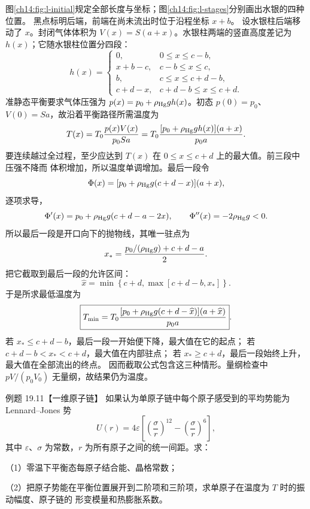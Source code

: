 \begin{xesolution}
图\ref{ch14:fig:l-initial}规定全部长度与坐标；图\ref{ch14:fig:l-stages}分别画出水银的四种位置。
黑点标明后端，前端在尚未流出时位于沿程坐标 $x+b$。
\lPipeStagesDiagram
设水银柱后端移动了 $x$。封闭气体体积为 $V(x)=S(a+x)$。水银柱两端的竖直高度差记为
$h(x)$；它随水银柱位置分四段：
\[
h(x)=
\begin{cases}
0,&0\le x\le c-b,\\
x+b-c,&c-b\le x\le c,\\
b,&c\le x\le c+d-b,\\
c+d-x,&c+d-b\le x\le c+d.
\end{cases}
\]
准静态平衡要求气体压强为 $p(x)=p_0+\rho_{\rm Hg}g h(x)$。初态 $p(0)=p_0$、
$V(0)=Sa$，故沿着平衡路径所需温度为
\[
 T(x)=T_0\frac{p(x)V(x)}{p_0Sa}
 =T_0\frac{[p_0+\rho_{\rm Hg}g h(x)](a+x)}{p_0a}.
\]
要连续越过全过程，至少应达到 $T(x)$ 在 $0\le x\le c+d$ 上的最大值。前三段中压强不降而
体积增加，所以温度单调增加。最后一段令
\[
 \Phi(x)=[p_0+\rho_{\rm Hg}g(c+d-x)](a+x),
\]
逐项求导，
\[
 \Phi'(x)=p_0+\rho_{\rm Hg}g(c+d-a-2x),\qquad
 \Phi''(x)=-2\rho_{\rm Hg}g<0.
\]
所以最后一段是开口向下的抛物线，其唯一驻点为
\[
 x_*=\frac{p_0/(\rho_{\rm Hg}g)+c+d-a}{2}.
\]
把它截取到最后一段的允许区间：
\[
 \widehat x=\min\!\left\{c+d,
 \max\!\left[c+d-b,x_*\right]\right\}.
\]
于是所求最低温度为
\[
 \boxed{T_{\min}=T_0
 \frac{[p_0+\rho_{\rm Hg}g(c+d-\widehat x)](a+\widehat x)}{p_0a}}.
\]
若 $x_*\le c+d-b$，最后一段一开始便下降，最大值在它的起点；
若 $c+d-b<x_*<c+d$，最大值在内部驻点；
若 $x_*\ge c+d$，最后一段始终上升，最大值在全部流出的终点。
因而截取公式包含这三种情形。量纲检查中
$pV/(p_0V_0)$ 无量纲，故结果仍为温度。
\end{xesolution}

\begin{origexamplebox}{例题 19.11【一维原子链】}
如果认为单原子链中每个原子感受到的平均势能为 Lennard--Jones 势
\begin{equation}
  U(r)=4\varepsilon\left[\left(\frac{\sigma}{r}\right)^{12}
  -\left(\frac{\sigma}{r}\right)^6\right],
\end{equation}
其中 $\varepsilon$、$\sigma$ 为常数，$r$ 为所有原子之间的统一间距。求：

（1）零温下平衡态每原子结合能、晶格常数；

（2）把原子势能在平衡位置展开到二阶项和三阶项，求单原子在温度为 $T$ 时的振动幅度、原子链的
形变模量和热膨胀系数。
\end{origexamplebox}

